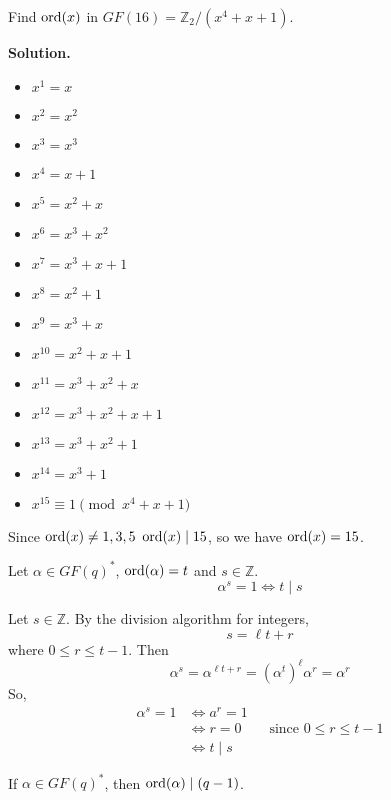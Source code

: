 \begin{Example}{}{}
    Find $ \operatorname{ord}(x) $ in $ GF(16)=\mathbb{Z}_2/(x^4+x+1) $.

    \textbf{Solution.}
    \begin{itemize}
        \item $ x^1=x $
        \item $ x^2=x^2 $
        \item $ x^3=x^3 $
        \item $ x^4=x+1 $
        \item $ x^5=x^2+x $
        \item $ x^6=x^3+x^2 $
        \item $ x^7=x^3+x+1 $
        \item $ x^8=x^2+1 $
        \item $ x^9=x^3+x $
        \item $ x^{10}=x^2+x+1 $
        \item $ x^{11}=x^3+x^2+x $
        \item $ x^{12}=x^3+x^2+x+1 $
        \item $ x^{13}=x^3+x^2+1 $
        \item $ x^{14}=x^3+1 $
        \item $ x^{15}\equiv 1\pmod{x^4+x+1} $
    \end{itemize}
    Since $ \operatorname{ord}(x)\neq 1,3,5 $ $ \operatorname{ord}(x)\mid 15 $, so we have $ \operatorname{ord}(x)=15 $.
\end{Example}

\begin{Lemma}{}{}
    Let $ \alpha\in GF(q)^* $, $ \operatorname{ord}(\alpha)=t $ and $ s\in\mathbb{Z} $.
    \[ \alpha^s=1\iff t\mid s \]
\end{Lemma}

\begin{Proof}{}{}
    Let $ s\in\mathbb{Z} $. By the division algorithm for integers,
    \[ s=\ell t+r \]
    where $ 0\leqslant r\leqslant t-1 $. Then
    \[ \alpha^s=\alpha^{\ell t+r}=(\alpha^t)^\ell \alpha^r=\alpha^r \]
    So,
    \begin{align*}
        \alpha^s=1 & \iff a^r=1                                             \\
                   & \iff r=0 \qquad\text{since } 0\leqslant r\leqslant t-1 \\
                   & \iff t\mid s
    \end{align*}
\end{Proof}

\begin{Corollary}{}{}
    If $ \alpha\in GF(q)^* $, then $ \operatorname{ord}(\alpha)\mid (q-1) $.
\end{Corollary}

